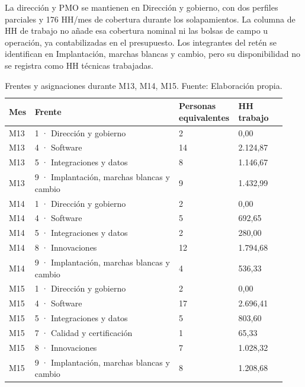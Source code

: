 \documentclass[11pt]{article}
\begin{document}
La dirección y PMO se mantienen en Dirección y gobierno, con dos perfiles parciales y 176 HH/mes de cobertura durante los solapamientos. La columna de HH de trabajo no añade esa cobertura nominal ni las bolsas de campo u operación, ya contabilizadas en el presupuesto. Los integrantes del retén se identifican en Implantación, marchas blancas y cambio, pero su disponibilidad no se registra como HH técnicas trabajadas.

\begingroup
\small
\begin{longtable}{@{}p{0.08\linewidth}p{0.51\linewidth}p{0.17\linewidth}p{0.17\linewidth}@{}}
\caption[Frentes y asignaciones durante M13, M14, M15]{Frentes y asignaciones durante M13, M14, M15. Fuente: Elaboración propia.}\label{tab:t15-frentes-13}\\
\toprule
\textbf{Mes} & \textbf{Frente} & \textbf{Personas equivalentes} & \textbf{HH trabajo} \\
\midrule
\endhead
\bottomrule
\endlastfoot
M13 & 1 · Dirección y gobierno & 2 & 0,00 \\
M13 & 4 · Software & 14 & 2.124,87 \\
M13 & 5 · Integraciones y datos & 8 & 1.146,67 \\
M13 & 9 · Implantación, marchas blancas y cambio & 9 & 1.432,99 \\
M14 & 1 · Dirección y gobierno & 2 & 0,00 \\
M14 & 4 · Software & 5 & 692,65 \\
M14 & 5 · Integraciones y datos & 2 & 280,00 \\
M14 & 8 · Innovaciones & 12 & 1.794,68 \\
M14 & 9 · Implantación, marchas blancas y cambio & 4 & 536,33 \\
M15 & 1 · Dirección y gobierno & 2 & 0,00 \\
M15 & 4 · Software & 17 & 2.696,41 \\
M15 & 5 · Integraciones y datos & 5 & 803,60 \\
M15 & 7 · Calidad y certificación & 1 & 65,33 \\
M15 & 8 · Innovaciones & 7 & 1.028,32 \\
M15 & 9 · Implantación, marchas blancas y cambio & 8 & 1.208,68 \\
\end{longtable}
\endgroup
\end{document}
